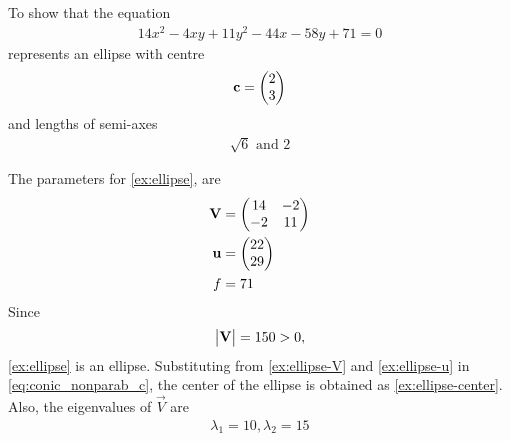 \begin{example}[ellipse]
	To show that the equation 
	\begin{align}
\label{ex:ellipse}
		14x^2 - 4xy + 11y^2-44x-58y+71=0
	\end{align}
	represents an ellipse with  centre
	\begin{align}
	    \label{ex:ellipse-center}
		\mathbf{c} = \begin{pmatrix}2 \\ 3\end{pmatrix}
	\end{align}
	and lengths of semi-axes
	\begin{align}
		\label{eq:ellipse-semi-axis}
		\sqrt{6} \text{ and } 2
	\end{align}
\end{example}
\solution   The parameters for
\eqref{ex:ellipse}, 
are 
\begin{align}
	    \label{ex:ellipse-V}
	\mathbf{V} &=\begin{pmatrix}14 & -2 \\ -2 & 11\end{pmatrix}
\\
	    \label{ex:ellipse-u}
	\mathbf{u} &= \begin{pmatrix}22 \\ 29\end{pmatrix}
\\
f &= 71
	    \label{ex:ellipse-f}
    \end{align}
    Since 
    \begin{align}
	    \begin{vmatrix}\mathbf{V}\end{vmatrix} = 150 > 0,
    \end{align}
\eqref{ex:ellipse} is an ellipse.  
Substituting from 
	    \eqref{ex:ellipse-V}
	    and 
	    \eqref{ex:ellipse-u}
	    in
    \eqref{eq:conic_nonparab_c},
the center of the ellipse is obtained as 
	    \eqref{ex:ellipse-center}.
Also, the eigenvalues of 
$\vec{V}$
are 
\begin{align}
	\lambda_1 = 10, 	\lambda_2 = 15
	    \label{ex:ellipse-lam}
    \end{align}

